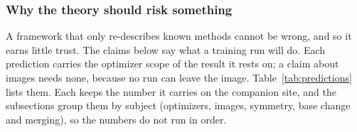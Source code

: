 \subsubsection{Why the theory should risk something}\label{sec:predictions-why}

A framework that only re-describes known methods cannot be wrong, and so it earns little trust. The claims below say what
a training run will do. Each prediction carries the optimizer scope of the result it rests on; a claim about images
needs none, because no run can leave the image. Table~\ref{tab:predictions} lists them. Each keeps the number it carries on
the companion site, and the subsections group them by subject (optimizers, images, symmetry, base change and merging),
so the numbers do not run in order.

